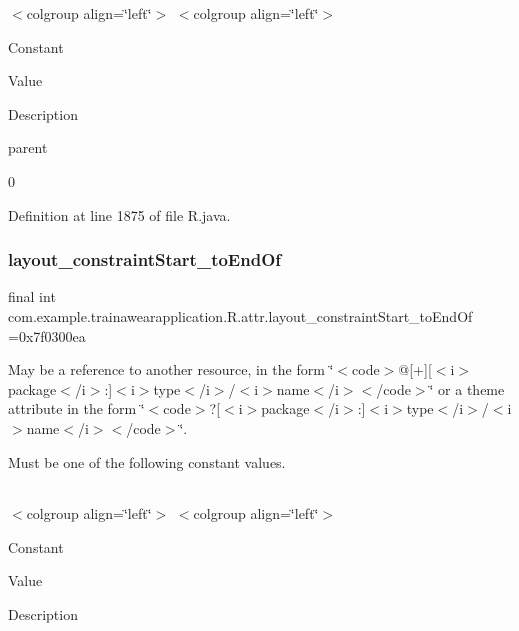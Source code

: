 \tabulinesep=1mm
\begin{longtabu}spread 0pt [c]{*{0}{|X[-1]}|}
\hline
\end{longtabu}
$<$colgroup align=\char`\"{}left\char`\"{}$>$ $<$colgroup align=\char`\"{}left\char`\"{}$>$ 

Constant

Value

Description 

parent

0

Definition at line 1875 of file R.\+java.

\mbox{\label{classcom_1_1example_1_1trainawearapplication_1_1_r_1_1attr_aa9d7703f07cfa469a46816b6a865ee30}} 
\subsubsection{\texorpdfstring{layout\_constraintStart\_toEndOf}{layout\_constraintStart\_toEndOf}}
{\footnotesize\ttfamily final int com.\+example.\+trainawearapplication.\+R.\+attr.\+layout\+\_\+constraint\+Start\+\_\+to\+End\+Of =0x7f0300ea\hspace{0.3cm}{\ttfamily [static]}}

May be a reference to another resource, in the form \char`\"{}$<$code$>$@\mbox{[}+\mbox{]}\mbox{[}$<$i$>$package$<$/i$>$\+:\mbox{]}$<$i$>$type$<$/i$>$/$<$i$>$name$<$/i$>$$<$/code$>$\char`\"{} or a theme attribute in the form \char`\"{}$<$code$>$?\mbox{[}$<$i$>$package$<$/i$>$\+:\mbox{]}$<$i$>$type$<$/i$>$/$<$i$>$name$<$/i$>$$<$/code$>$\char`\"{}. 

Must be one of the following constant values.

\tabulinesep=1mm
\begin{longtabu}spread 0pt [c]{*{0}{|X[-1]}|}
\hline
\end{longtabu}
$<$colgroup align=\char`\"{}left\char`\"{}$>$ $<$colgroup align=\char`\"{}left\char`\"{}$>$ 

Constant

Value

Description 

